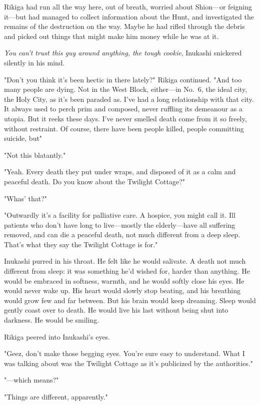 Rikiga had run all the way here, out of breath, worried about Shion---or
feigning it---but had managed to collect information about the Hunt, and
investigated the remains of the destruction on the way. Maybe he had
rifled through the debris and picked out things that might make him
money while he was at it.

\emph{You can't trust this guy around anything, the tough cookie}, Inukashi
snickered silently in his mind.

"Don't you think it's been hectic in there lately?" Rikiga continued.
"And too many people are dying. Not in the West Block, either---in No.~6,
the ideal city, the Holy City, as it's been paraded as. I've had a long
relationship with that city. It always used to perch prim and composed,
never ruffling its demeanour as a utopia. But it reeks these days. I've
never smelled death come from it so freely, without restraint. Of
course, there have been people killed, people committing suicide,
but\el "

"Not this blatantly."

"Yeah. Every death they put under wraps, and disposed of it as a calm
and peaceful death. Do you know about the Twilight Cottage?"

"Whas' that?"

"Outwardly it's a facility for palliative care. A hospice, you might
call it. Ill patients who don't have long to live---mostly the
elderly---have all suffering removed, and can die a peaceful death, not
much different from a deep sleep. That's what they say the Twilight
Cottage is for."

Inukashi purred in his throat. He felt like he would salivate. A death
not much different from sleep: it was something he'd wished for, harder
than anything. He would be embraced in softness, warmth, and he would
softly close his eyes. He would never wake up. His heart would slowly
stop beating, and his breathing would grow few and far between. But his
brain would keep dreaming. Sleep would gently coast over to death. He
would live his last without being shut into darkness. He would be
smiling.

Rikiga peered into Inukashi's eyes.

"Geez, don't make those begging eyes. You're sure easy to understand.
What I was talking about was the Twilight Cottage as it's publicized by
the authorities."

"---which means?"

"Things are different, apparently."

